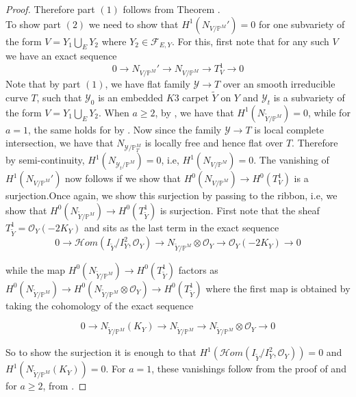 \documentclass[11pt,twoside]{amsart}
\theoremstyle{plain}
\numberwithin{equation}{section}
\theoremstyle{definition}
\begin{document}
\begin{proof}
Therefore part $(1)$ follows from Theorem \cite[Theorem $2.10$]{BGM24}. \\
To show part $(2)$ we need to show that $H^1(N_{V/\mathbb{P}^M}') = 0$ for one subvariety of the form $V = Y_1 \bigcup_E Y_2$ where $Y_2 \in \mathcal{F}_{E,Y}$. For this, first note that for any such $V$ we have an exact sequence 
$$0 \to N_{V/\mathbb{P}^M}' \to N_{V/\mathbb{P}^M} \to T_V^1 \to 0$$
Note that by part $(1)$, we have flat family $\mathcal{Y} \to T$ over an smooth irreducible curve $T$, such that $\mathcal{Y}_0$ is an embedded $K3$ carpet $\widetilde{Y}$ on $Y$ and $\mathcal{Y}_t$ is a subvariety of the form $V = Y_1 \bigcup_E Y_2$. When $a \geq 2$, by \cite[Theorem $5.1$, equation $(5.9)$]{BMR21}, we have that $H^1(N_{\widetilde{Y}/\mathbb{P}^M}) = 0$, while for $a = 1$, the same holds for by \cite[Theorem $4.1$]{GP97}. Now since the family $\mathcal{Y} \to T$ is local complete intersection, we have that $N_{\mathcal{Y}/\mathbb{P}_T^M}$ is locally free and hence flat over $T$. Therefore by semi-continuity, $H^1(N_{\mathcal{Y}_t/\mathbb{P}^M}) = 0$, i.e, $H^1(N_{V/\mathbb{P}^M}) = 0$. The vanishing of $H^1(N_{V/\mathbb{P}^M}')$ now follows if we show that $H^0(N_{V/\mathbb{P}^M}) \to H^0(T_V^1)$ is a surjection.Once again, we show this surjection by passing to the ribbon, i.e, we show that $H^0(N_{\widetilde{Y}/\mathbb{P}^M}) \to H^0(T_{\widetilde{Y}}^1)$ is surjection. First note that the sheaf $T_{\widetilde{Y}}^1 = \mathcal{O}_Y(-2K_Y)$ and sits as the last term in the exact sequence 
\begin{equation*}
    0 \to \mathcal{H}om(I_{\widetilde{Y}}/I_{Y}^2, \mathcal{O}_Y) \to N_{\widetilde{Y}/\mathbb{P}^M} \otimes \mathcal{O}_Y \to \mathcal{O}_Y(-2K_Y) \to 0
\end{equation*}

while the map $H^0(N_{\widetilde{Y}/\mathbb{P}^M}) \to H^0(T_{\widetilde{Y}}^1)$ factors as $H^0(N_{\widetilde{Y}/\mathbb{P}^M}) \to H^0(N_{\widetilde{Y}/\mathbb{P}^M} \otimes \mathcal{O}_Y) \to H^0(T_{\widetilde{Y}}^1)$ where the first map is obtained by taking the cohomology of the exact sequence

\begin{equation*}
 0 \to N_{\widetilde{Y}/\mathbb{P}^M} (K_Y) \to N_{\widetilde{Y}/\mathbb{P}^M} \to N_{\widetilde{Y}/\mathbb{P}^M} \otimes \mathcal{O}_Y \to 0   
\end{equation*}

So to show the surjection it is enough to that $H^1(\mathcal{H}om(I_{\widetilde{Y}}/I_{Y}^2, \mathcal{O}_Y)) = 0$ and $H^1(N_{\widetilde{Y}/\mathbb{P}^M} (K_Y)) = 0$. For $a = 1$, these vanishings follow from the proof of \cite[Theorem $4.1$]{GP97} and for $a \geq 2$, from \cite[Theorem $5.1$]{BMR21}.



\end{proof}
\end{document}
